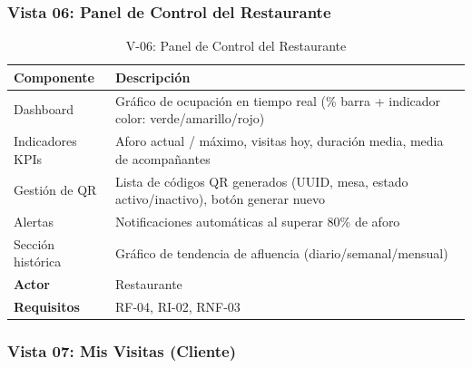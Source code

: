 \subsubsection{Vista 06: Panel de Control del Restaurante}

\begin{table}[H]
    \centering
    \caption{V-06: Panel de Control del Restaurante}
    \label{tab:vista06}
    \begin{tabular}{|>{\raggedright\arraybackslash}p{}|>{\raggedright\arraybackslash}p{}|}
        \hline
        \textbf{Componente} & \textbf{Descripción} \\
        \hline
        Dashboard & Gráfico de ocupación en tiempo real (\% barra + indicador color: verde/amarillo/rojo) \\
        \hline
        Indicadores KPIs & Aforo actual / máximo, visitas hoy, duración media, media de acompañantes \\
        \hline
        Gestión de QR & Lista de códigos QR generados (UUID, mesa, estado activo/inactivo), botón generar nuevo \\
        \hline
        Alertas & Notificaciones automáticas al superar 80\% de aforo \\
        \hline
        Sección histórica & Gráfico de tendencia de afluencia (diario/semanal/mensual) \\
        \hline
        \textbf{Actor} & Restaurante \\
        \hline
        \textbf{Requisitos} & RF-04, RI-02, RNF-03 \\
        \hline
    \end{tabular}
\end{table}

\subsubsection{Vista 07: Mis Visitas (Cliente)}

